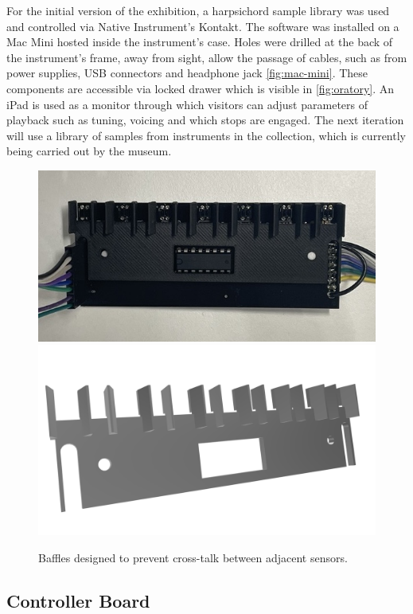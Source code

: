 For the initial version of the exhibition, a harpsichord sample library was used and controlled via Native Instrument's Kontakt. The software was installed on a Mac Mini hosted inside the instrument's case. Holes were drilled at the back of the instrument's frame, away from sight, allow the passage of cables, such as from power supplies, USB connectors and headphone jack \ref{fig:mac-mini}. These components are accessible via locked drawer which is visible in \ref{fig:oratory}. An iPad is used as a monitor through which visitors can adjust parameters of playback such as tuning, voicing and which stops are engaged. The next iteration will use a library of samples from instruments in the collection, which is currently being carried out by the museum.

\begin{figure}[!hb]
    \centering
    \includegraphics[width=0.8\linewidth]{src/images/sensor-board-w-baffles.jpeg}
    \\
    \includegraphics[width=0.8\linewidth]{src/images/baffles.png}
    \caption{Baffles designed to prevent cross-talk between adjacent sensors.}
    \Description{}
    \label{fig:baffles}
\end{figure}
\subsection{Controller Board}\label{controller-board}


